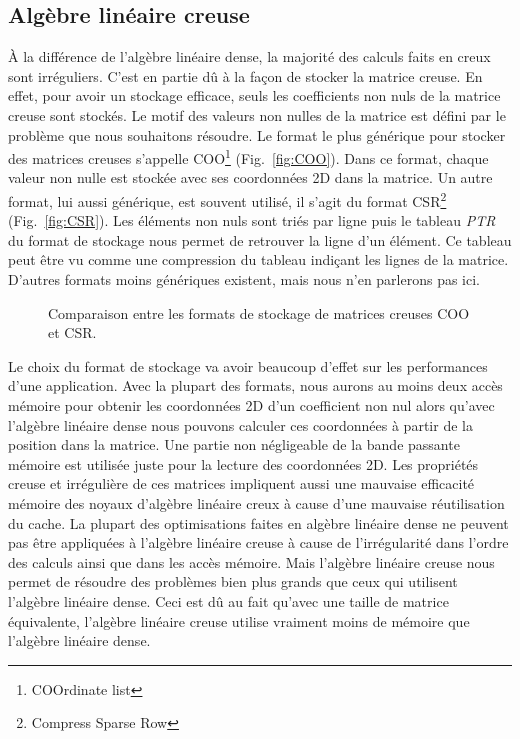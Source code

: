 \subsection{Algèbre linéaire creuse}
\`{A} la différence de l'algèbre linéaire dense, la majorité des calculs faits en creux sont irréguliers.
%
C'est en partie dû à la façon de stocker la matrice creuse.
%
En effet, pour avoir un stockage efficace, seuls les coefficients non nuls de la matrice creuse sont stockés.
%
Le motif des valeurs non nulles de la matrice est défini par le problème que nous souhaitons résoudre.
%
Le format le plus générique pour stocker des matrices creuses s'appelle COO\footnote{COOrdinate list} (Fig.~\ref{fig:COO}).
%
Dans ce format, chaque valeur non nulle est stockée avec ses coordonnées 2D dans la matrice.
%
Un autre format, lui aussi générique, est souvent utilisé, il s'agit du format CSR\footnote{Compress Sparse Row} (Fig.~\ref{fig:CSR}).
%
Les éléments non nuls sont triés par ligne puis le tableau {\em PTR} du format de stockage nous permet de retrouver la ligne d'un élément.
%
Ce tableau peut être vu comme une compression du tableau indiçant les lignes de la matrice.
%
D'autres formats moins génériques existent, mais nous n'en parlerons pas ici.
\begin{figure}[!h]
     \begin{center}
    \end{center}
    \caption{Comparaison entre les formats de stockage de matrices creuses COO et CSR.}
    \label{fig:matrix_storage}
\end{figure}
Le choix du format de stockage va avoir beaucoup d'effet sur les performances d'une application.
%
Avec la plupart des formats, nous aurons au moins deux accès mémoire pour obtenir les coordonnées 2D d'un coefficient non nul alors qu'avec l'algèbre linéaire dense nous pouvons calculer ces coordonnées à partir de la position dans la matrice.
%
Une partie non négligeable de la bande passante mémoire est utilisée juste pour la lecture des coordonnées 2D.
%
Les propriétés creuse et irrégulière de ces matrices impliquent aussi une mauvaise efficacité mémoire des noyaux d'algèbre linéaire creux à cause d'une mauvaise réutilisation du cache.
%
La plupart des optimisations faites en algèbre linéaire dense ne peuvent pas être appliquées à l'algèbre linéaire creuse à cause de l'irrégularité dans l'ordre des calculs ainsi que dans les accès mémoire.
%
Mais l'algèbre linéaire creuse nous permet de résoudre des problèmes bien plus grands que ceux qui utilisent l'algèbre linéaire dense.
%
Ceci est dû au fait qu'avec une taille de matrice équivalente, l'algèbre linéaire creuse utilise vraiment moins de mémoire que l'algèbre linéaire dense.


